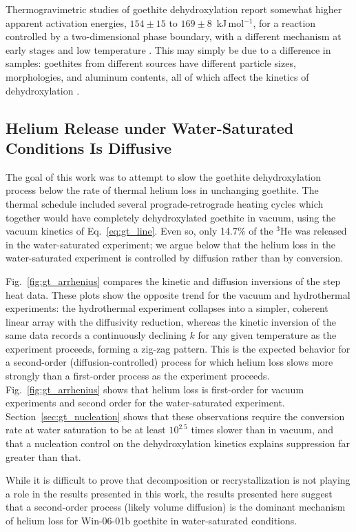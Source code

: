 Thermogravimetric studies of goethite dehydroxylation report somewhat higher apparent activation
energies, $154\pm15$ to $169\pm8$~kJ\,mol$^{-1}$, for a reaction controlled by a two-dimensional
phase boundary, with a different mechanism at early stages and low temperature \citep{goss1987}. This may simply
be due to a difference in samples: goethites from different sources have different particle sizes, morphologies, 
and aluminum contents, all of which affect the kinetics of dehydroxylation \citep{langmuir1971,yapp1983,tardy1985,majzlannavrotsky2003}.

\subsection{Helium Release under Water-Saturated Conditions Is Diffusive}\label{sec:gt_hydro}

The goal of this work was to attempt to slow the goethite dehydroxylation process
below the rate of thermal helium loss in unchanging goethite.
The thermal schedule included several prograde-retrograde heating cycles
which together would have completely dehydroxylated goethite in vacuum, using the vacuum kinetics of
Eq.~\eqref{eq:gt_line}. Even so, only 14.7\% of the $^3$He was released in the water-saturated experiment;
we argue below that the helium loss in the water-saturated experiment is controlled by diffusion rather than by conversion.

Fig.~\ref{fig:gt_arrhenius} compares the kinetic and diffusion inversions of the step heat data.
These plots show the opposite trend for the vacuum and hydrothermal experiments: the hydrothermal experiment collapses into a simpler, coherent
linear array with the diffusivity reduction, whereas the kinetic inversion of the same data records a continuously declining $k$ for any given temperature as 
the experiment proceeds, forming a zig-zag pattern. This is the expected behavior for a second-order (diffusion-controlled) process for which helium loss 
slows more strongly than a first-order process as the experiment proceeds. Fig.~\ref{fig:gt_arrhenius} shows that helium loss 
is first-order for vacuum experiments and second order for the water-saturated experiment. Section~\ref{sec:gt_nucleation} shows 
that these observations require the conversion rate at water saturation to be at least $10^{2.5}$ times slower than in vacuum, and that a
nucleation control on the dehydroxylation kinetics explains suppression far greater than that. 

While it is difficult to prove that decomposition or recrystallization is not
playing a role in the results presented in this work, the results presented here suggest that 
a second-order process (likely volume diffusion) is the dominant mechanism of helium loss for Win-06-01b goethite in water-saturated conditions.

